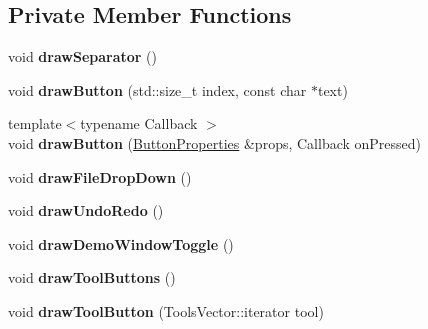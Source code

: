 \subsection*{Private Member Functions}
\begin{DoxyCompactItemize}
\item 
\mbox{\label{classpepr3d_1_1_toolbar_a1d55b21ed7022216756d4d156c8f1e52}} 
void {\bfseries draw\+Separator} ()
\item 
\mbox{\label{classpepr3d_1_1_toolbar_a34bebb48d1670eca31d68b998a088e70}} 
void {\bfseries draw\+Button} (std\+::size\+\_\+t index, const char $\ast$text)
\item 
\mbox{\label{classpepr3d_1_1_toolbar_a8ec26251465c349def3cb032370bdf25}} 
{\footnotesize template$<$typename Callback $>$ }\\void {\bfseries draw\+Button} (\mbox{\hyperlink{structpepr3d_1_1_toolbar_1_1_button_properties}{Button\+Properties}} \&props, Callback on\+Pressed)
\item 
\mbox{\label{classpepr3d_1_1_toolbar_aceb99e5459d3b1ba1d557caeec2e57d1}} 
void {\bfseries draw\+File\+Drop\+Down} ()
\item 
\mbox{\label{classpepr3d_1_1_toolbar_afd2e255728e6b0962da017f3ee1822bc}} 
void {\bfseries draw\+Undo\+Redo} ()
\item 
\mbox{\label{classpepr3d_1_1_toolbar_afde0b64ad68c0203195fa59327f57c02}} 
void {\bfseries draw\+Demo\+Window\+Toggle} ()
\item 
\mbox{\label{classpepr3d_1_1_toolbar_a88b084de711b74735348315189c01fe7}} 
void {\bfseries draw\+Tool\+Buttons} ()
\item 
\mbox{\label{classpepr3d_1_1_toolbar_a9366ee163dfe041a2661fe5eb664a325}} 
void {\bfseries draw\+Tool\+Button} (Tools\+Vector\+::iterator tool)
\end{DoxyCompactItemize}
